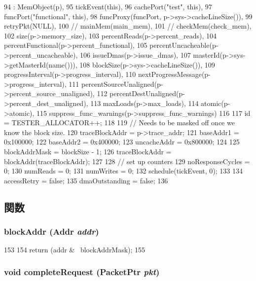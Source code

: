 \begin{DoxyCode}
94     : MemObject(p),
95       tickEvent(this),
96       cachePort("test", this),
97       funcPort("functional", this),
98       funcProxy(funcPort, p->sys->cacheLineSize()),
99       retryPkt(NULL),
100 //      mainMem(main_mem),
101 //      checkMem(check_mem),
102       size(p->memory_size),
103       percentReads(p->percent_reads),
104       percentFunctional(p->percent_functional),
105       percentUncacheable(p->percent_uncacheable),
106       issueDmas(p->issue_dmas),
107       masterId(p->sys->getMasterId(name())),
108       blockSize(p->sys->cacheLineSize()),
109       progressInterval(p->progress_interval),
110       nextProgressMessage(p->progress_interval),
111       percentSourceUnaligned(p->percent_source_unaligned),
112       percentDestUnaligned(p->percent_dest_unaligned),
113       maxLoads(p->max_loads),
114       atomic(p->atomic),
115       suppress_func_warnings(p->suppress_func_warnings)
116 {
117     id = TESTER_ALLOCATOR++;
118 
119     // Needs to be masked off once we know the block size.
120     traceBlockAddr = p->trace_addr;
121     baseAddr1 = 0x100000;
122     baseAddr2 = 0x400000;
123     uncacheAddr = 0x800000;
124 
125     blockAddrMask = blockSize - 1;
126     traceBlockAddr = blockAddr(traceBlockAddr);
127 
128     // set up counters
129     noResponseCycles = 0;
130     numReads = 0;
131     numWrites = 0;
132     schedule(tickEvent, 0);
133 
134     accessRetry = false;
135     dmaOutstanding = false;
136 }
\end{DoxyCode}


\subsection{関数}
\hypertarget{classMemTest_adb0890c3c50f747f06c26986a37a5f99}{
\subsubsection[{blockAddr}]{ blockAddr ({\bf Addr} {\em addr})}}
\label{classMemTest_adb0890c3c50f747f06c26986a37a5f99}



\begin{DoxyCode}
153     {
154         return (addr & ~blockAddrMask);
155     }
\end{DoxyCode}
\hypertarget{classMemTest_afad8eceee562939262183ad20f806b82}{
\subsubsection[{completeRequest}]{\setlength{\rightskip}{0pt plus 5cm}void completeRequest ({\bf PacketPtr} {\em pkt})}}
\label{classMemTest_afad8eceee562939262183ad20f806b82}




